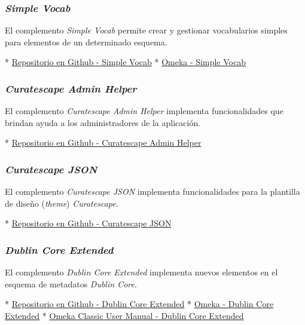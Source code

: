 \documentclass[
]{article}
\begin{document}
\hypertarget{simple-vocab}{%
\subsubsection{\texorpdfstring{\emph{Simple
Vocab}}{Simple Vocab}}\label{simple-vocab}}

El complemento \emph{Simple Vocab} permite crear y gestionar
vocabularios simples para elementos de un determinado esquema.

* \href{https://github.com/omeka/plugin-SimpleVocab}{Repositorio en
Github - Simple Vocab} *
\href{https://omeka.org/classic/plugins/SimpleVocab/}{Omeka - Simple
Vocab}

\hypertarget{curatescape-admin-helper}{%
\subsubsection{\texorpdfstring{\emph{Curatescape Admin
Helper}}{Curatescape Admin Helper}}\label{curatescape-admin-helper}}

El complemento \emph{Curatescape Admin Helper} implementa
funcionalidades que brindan ayuda a los administradores de la
aplicación.

* \href{https://github.com/CPHDH/CuratescapeAdminHelper}{Repositorio en
Github - Curatescape Admin Helper}

\hypertarget{curatescape-json}{%
\subsubsection{\texorpdfstring{\emph{Curatescape
JSON}}{Curatescape JSON}}\label{curatescape-json}}

El complemento \emph{Curatescape JSON} implementa funcionalidades para
la plantilla de diseño (\emph{theme}) \emph{Curatescape}.

* \href{https://github.com/CPHDH/CuratescapeJSON}{Repositorio en Github
- Curatescape JSON}

\hypertarget{dublin-core-extended}{%
\subsubsection{\texorpdfstring{\emph{Dublin Core
Extended}}{Dublin Core Extended}}\label{dublin-core-extended}}

El complemento \emph{Dublin Core Extended} implementa nuevos elementos
en el esquema de metadatos \emph{Dublin Core}.

* \href{https://github.com/omeka/plugin-DublinCoreExtended}{Repositorio
en Github - Dublin Core Extended} *
\href{https://omeka.org/classic/plugins/DublinCoreExtended/}{Omeka -
Dublin Core Extended} *
\href{https://omeka.org/classic/docs/Plugins/DublinCoreExtended/}{Omeka
Classic User Manual - Dublin Core Extended}
\end{document}
